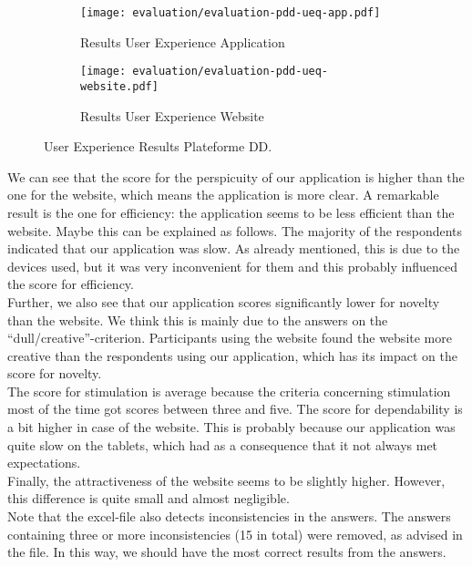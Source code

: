 \begin{figure}[H]
	\centering
	\begin{subfigure}{.49\textwidth}
  		\centering
  		\texttt{[image: evaluation/evaluation-pdd-ueq-app.pdf]}
  		\caption{Results User Experience Application}
	\end{subfigure}%
	\begin{subfigure}{.49\textwidth}
  		\centering
  		\texttt{[image: evaluation/evaluation-pdd-ueq-website.pdf]}
  		\caption{Results User Experience Website}
	\end{subfigure}
	\caption{User Experience Results Plateforme DD.}
	\label{fig:evaluation-pdd-ueq}
\end{figure}

We can see that the score for the perspicuity of our application is higher than the one for the website, which means the application is more clear. A remarkable result is the one for efficiency: the application seems to be less efficient than the website. Maybe this can be explained as follows. The majority of the respondents indicated that our application was slow. As already mentioned, this is due to the devices used, but it was very inconvenient for them and this probably influenced the score for efficiency.\\

Further, we also see that our application scores significantly lower for novelty than the website. We think this is mainly due to the answers on the ``dull/creative''-criterion. Participants using the website found the website more creative than the respondents using our application, which has its impact on the score for novelty.\\

The score for stimulation is average because the criteria concerning stimulation most of the time got scores between three and five. The score for dependability is a bit higher in case of the website. This is probably because our application was quite slow on the tablets, which had as a consequence that it not always met expectations.\\

Finally, the attractiveness of the website seems to be slightly higher. However, this difference is quite small and almost negligible.\\

Note that the excel-file also detects inconsistencies in the answers. The answers containing three or more inconsistencies (15 in total) were removed, as advised in the file. In this way, we should have the most correct results from the answers.

